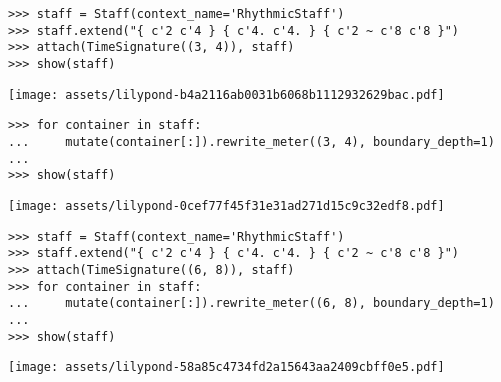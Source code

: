 \begin{comment}
<abjad>
staff = Staff(context_name='RhythmicStaff')
staff.extend("{ c'2 c'4 } { c'4. c'4. } { c'2 ~ c'8 c'8 }")
attach(TimeSignature((3, 4)), staff)
show(staff)
</abjad>
\end{comment}

\begin{singlespacing}
\vspace{-0.5\baselineskip}
\begin{lstlisting}
>>> staff = Staff(context_name='RhythmicStaff')
>>> staff.extend("{ c'2 c'4 } { c'4. c'4. } { c'2 ~ c'8 c'8 }")
>>> attach(TimeSignature((3, 4)), staff)
>>> show(staff)
\end{lstlisting}
\noindent\texttt{[image: assets/lilypond-b4a2116ab0031b6068b1112932629bac.pdf]}
\end{singlespacing}

\begin{comment}
<abjad>
for container in staff:
    mutate(container[:]).rewrite_meter((3, 4), boundary_depth=1)

show(staff)
</abjad>
\end{comment}

\begin{singlespacing}
\vspace{-0.5\baselineskip}
\begin{lstlisting}
>>> for container in staff:
...     mutate(container[:]).rewrite_meter((3, 4), boundary_depth=1)
...
>>> show(staff)
\end{lstlisting}
\noindent\texttt{[image: assets/lilypond-0cef77f45f31e31ad271d15c9c32edf8.pdf]}
\end{singlespacing}

\begin{comment}
<abjad>
staff = Staff(context_name='RhythmicStaff')
staff.extend("{ c'2 c'4 } { c'4. c'4. } { c'2 ~ c'8 c'8 }")
attach(TimeSignature((6, 8)), staff)
for container in staff:
    mutate(container[:]).rewrite_meter((6, 8), boundary_depth=1)

show(staff)
</abjad>
\end{comment}

\begin{singlespacing}
\vspace{-0.5\baselineskip}
\begin{lstlisting}
>>> staff = Staff(context_name='RhythmicStaff')
>>> staff.extend("{ c'2 c'4 } { c'4. c'4. } { c'2 ~ c'8 c'8 }")
>>> attach(TimeSignature((6, 8)), staff)
>>> for container in staff:
...     mutate(container[:]).rewrite_meter((6, 8), boundary_depth=1)
...
>>> show(staff)
\end{lstlisting}
\noindent\texttt{[image: assets/lilypond-58a85c4734fd2a15643aa2409cbff0e5.pdf]}
\end{singlespacing}

